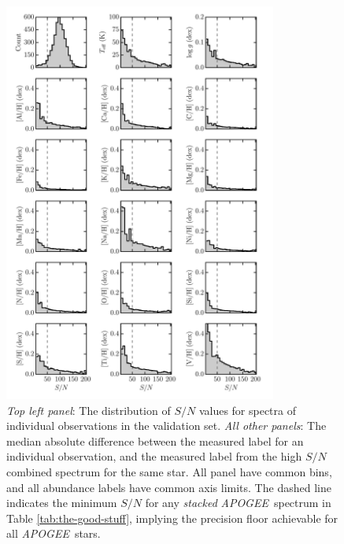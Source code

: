 \documentclass[12pt,preprint]{aastex}
\newcommand{\project}[1]{\textsl{#1}}
\newcommand{\acronym}[1]{{\small{#1}}}
\newcommand{\apogee}{\project{\acronym{APOGEE}}}
\begin{document}
\begin{figure}[p]
\includegraphics[width=0.8\textwidth]{validation-label-recovery.pdf}
\caption{\emph{Top left panel}: The distribution of $S/N$ values for spectra of individual observations in the validation set. \emph{All other panels}: The median absolute difference between the measured label for an individual observation, and the measured label from the high $S/N$ combined spectrum for the same star.  All panel have common bins, and all abundance labels have common axis limits.  The dashed line indicates the minimum $S/N$ for any \emph{stacked} \apogee\ spectrum in Table \ref{tab:the-good-stuff}, implying the precision floor achievable for all \apogee\ stars.\label{fig:label-recovery-snr}}
\end{figure}
\end{document}
